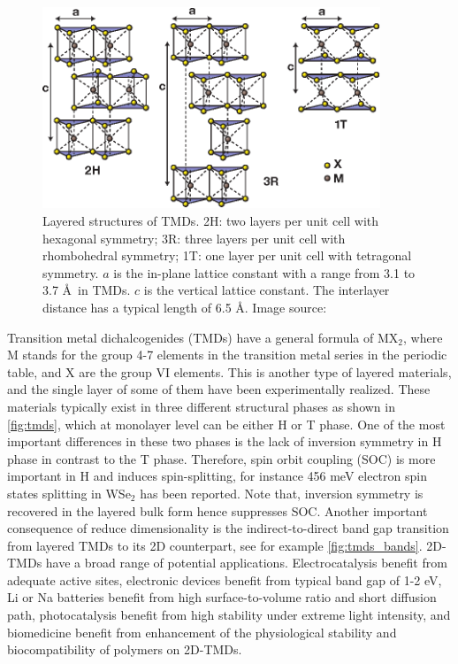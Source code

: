 \begin{figure}[htbp!] 
\centering  
\includegraphics[width=0.9\textwidth]{tmds.eps}
\caption[Layered structures of TMDs]{Layered structures of TMDs. 2H: two layers per unit cell with hexagonal symmetry; 3R: three layers per unit cell with rhombohedral symmetry; 1T: one layer per unit cell with tetragonal symmetry. $a$ is the in-plane lattice constant with a range from 3.1 to 3.7 \AA~in TMDs. $c$ is the vertical lattice constant. The interlayer distance has a typical length of 6.5 \AA. Image source: \cite{Wang2012}}  
\label{fig:tmds}
\end{figure} 

Transition metal dichalcogenides (TMDs) have a general formula of MX$_2$, where M stands for the group 4-7 elements in the transition metal series in the periodic table, and X are the group VI elements. This is another type of layered materials, and the single layer of some of them have been experimentally realized.  These materials typically exist in three different structural phases as shown in \autoref{fig:tmds}, which at monolayer level can be either H or T phase. One of the most important differences in these two phases is the lack of inversion symmetry in H phase in contrast to the T phase. Therefore, spin orbit coupling (SOC) is more important in H and induces spin-splitting, for instance 456 meV electron spin states splitting in WSe$_2$\cite{Zhu2011giant} has been reported. Note that, inversion symmetry is recovered in the layered bulk form hence suppresses SOC. Another important consequence of reduce dimensionality is the indirect-to-direct band gap transition from layered TMDs to its 2D counterpart, see for example \autoref{fig:tmds_bands}. 2D-TMDs have a broad range of potential applications. Electrocatalysis\cite{kim2013enhanced,huang2014synthesis} benefit from adequate active sites, electronic devices\cite{RadisavljevicB2011,sun2014fabrication} benefit from typical band gap of 1-2 eV, Li or Na batteries\cite{chang2011cysteine,chen2013situ} benefit from high surface-to-volume ratio and short diffusion path, photocatalysis benefit from high stability under extreme light intensity\cite{Li2013,Parzinger2015}, and biomedicine benefit from enhancement of the physiological stability and biocompatibility of polymers on 2D-TMDs\cite{Cheng2014,Yin2014}. 



